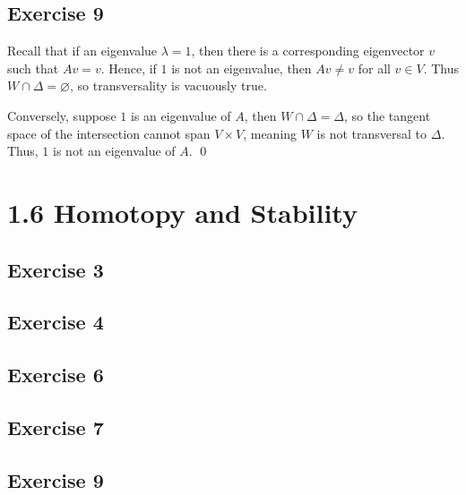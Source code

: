 \documentclass{article}
\begin{document}
  \subsection*{Exercise 9}
    Recall that if an eigenvalue $\lambda=1$, then there is a corresponding
    eigenvector $v$ such that $Av=v$. Hence, if $1$ is not an eigenvalue, then
    $Av\ne v$ for all $v\in V$. Thus $W\cap\Delta=\varnothing$, so
    transversality is vacuously true.

    Conversely, suppose $1$ is an eigenvalue of $A$, then $W\cap\Delta=\Delta$,
    so the tangent space of the intersection cannot span $V\times V$, meaning
    $W$ is not transversal to $\Delta$. Thus, $1$ is not an eigenvalue of $A$.
    \qed

\section*{1.6 Homotopy and Stability}
  \subsection*{Exercise 3}
  \subsection*{Exercise 4}
  \subsection*{Exercise 6}
  \subsection*{Exercise 7}
  \subsection*{Exercise 9}
\end{document}
